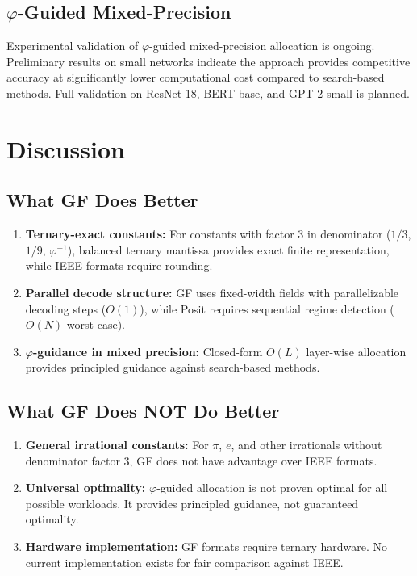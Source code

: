 \documentclass{article}
\begin{document}
\subsection{$\varphi$-Guided Mixed-Precision}

Experimental validation of $\varphi$-guided mixed-precision allocation is ongoing. Preliminary results on small networks indicate the approach provides competitive accuracy at significantly lower computational cost compared to search-based methods. Full validation on ResNet-18, BERT-base, and GPT-2 small is planned.


\section{Discussion}

\subsection{What GF Does Better}

\begin{enumerate}
    \item \textbf{Ternary-exact constants:} For constants with factor 3 in denominator ($1/3$, $1/9$, $\varphi^{-1}$), balanced ternary mantissa provides exact finite representation, while IEEE formats require rounding.
    \item \textbf{Parallel decode structure:} GF uses fixed-width fields with parallelizable decoding steps ($O(1)$), while Posit requires sequential regime detection ($O(N)$ worst case).
    \item \textbf{$\varphi$-guidance in mixed precision:} Closed-form $O(L)$ layer-wise allocation provides principled guidance against search-based methods.
\end{enumerate}

\subsection{What GF Does NOT Do Better}

\begin{enumerate}
    \item \textbf{General irrational constants:} For $\pi$, $e$, and other irrationals without denominator factor 3, GF does not have advantage over IEEE formats.
    \item \textbf{Universal optimality:} $\varphi$-guided allocation is not proven optimal for all possible workloads. It provides principled guidance, not guaranteed optimality.
    \item \textbf{Hardware implementation:} GF formats require ternary hardware. No current implementation exists for fair comparison against IEEE.
\end{enumerate}
\end{document}
